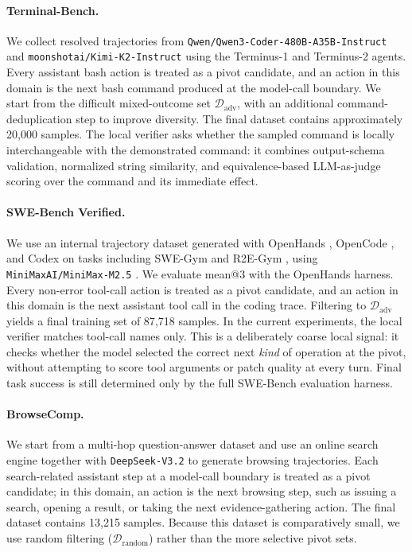 \paragraph{Terminal-Bench.}
We collect resolved trajectories from \texttt{Qwen/Qwen3-Coder-480B-A35B-Instruct} and \texttt{moonshotai/Kimi-K2-Instruct} using the Terminus-1 and Terminus-2 agents. Every assistant bash action is treated as a pivot candidate, and an action in this domain is the next bash command produced at the model-call boundary. We start from the difficult mixed-outcome set $\mathcal{D}_{\mathrm{adv}}$, with an additional command-deduplication step to improve diversity. The final dataset contains approximately 20{,}000 samples. The local verifier asks whether the sampled command is locally interchangeable with the demonstrated command: it combines output-schema validation, normalized string similarity, and equivalence-based LLM-as-judge scoring over the command and its immediate effect.

\paragraph{SWE-Bench Verified.}
We use an internal trajectory dataset generated with OpenHands \citep{wang2025openhandsopenplatformai}, OpenCode \citep{opencode}, and Codex \citep{openaicodex_software} on tasks including SWE-Gym \citep{pan2025trainingsoftwareengineeringagents} and R2E-Gym \citep{jain2025r2egymproceduralenvironmentshybrid}, using \texttt{MiniMaxAI/MiniMax-M2.5} \citep{minimax2026m25}. We evaluate mean@3 with the OpenHands harness. Every non-error tool-call action is treated as a pivot candidate, and an action in this domain is the next assistant tool call in the coding trace. Filtering to $\mathcal{D}_{\mathrm{adv}}$ yields a final training set of 87{,}718 samples. In the current experiments, the local verifier matches tool-call names only. This is a deliberately coarse local signal: it checks whether the model selected the correct next \emph{kind} of operation at the pivot, without attempting to score tool arguments or patch quality at every turn. Final task success is still determined only by the full SWE-Bench evaluation harness.

\paragraph{BrowseComp.}
We start from a multi-hop question-answer dataset and use an online search engine together with \texttt{DeepSeek-V3.2} to generate browsing trajectories. Each search-related assistant step at a model-call boundary is treated as a pivot candidate; in this domain, an action is the next browsing step, such as issuing a search, opening a result, or taking the next evidence-gathering action. The final dataset contains 13{,}215 samples. Because this dataset is comparatively small, we use random filtering ($\mathcal{D}_{\mathrm{random}}$) rather than the more selective pivot sets.